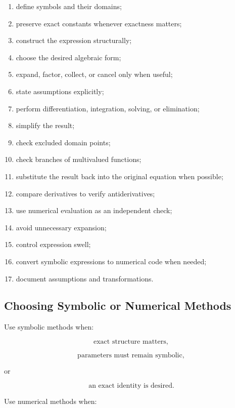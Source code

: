 \begin{enumerate}
    \item define symbols and their domains;
    \item preserve exact constants whenever exactness matters;
    \item construct the expression structurally;
    \item choose the desired algebraic form;
    \item expand, factor, collect, or cancel only when useful;
    \item state assumptions explicitly;
    \item perform differentiation, integration, solving, or elimination;
    \item simplify the result;
    \item check excluded domain points;
    \item check branches of multivalued functions;
    \item substitute the result back into the original equation when
          possible;
    \item compare derivatives to verify antiderivatives;
    \item use numerical evaluation as an independent check;
    \item avoid unnecessary expansion;
    \item control expression swell;
    \item convert symbolic expressions to numerical code when needed;
    \item document assumptions and transformations.
\end{enumerate}

\subsection{Choosing Symbolic or Numerical Methods}
\label{subsec:choosing-symbolic-or-numerical}

Use symbolic methods when:

\[
\boxed{
\text{exact structure matters},
}
\]

\[
\boxed{
\text{parameters must remain symbolic},
}
\]

or

\[
\boxed{
\text{an exact identity is desired}.
}
\]

Use numerical methods when:


